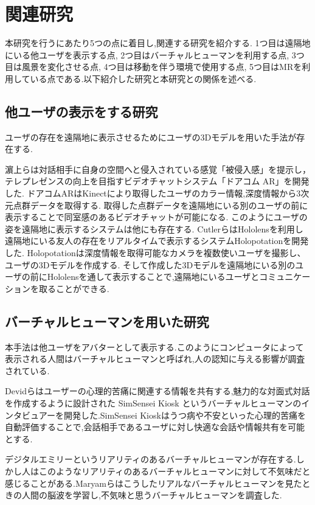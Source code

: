\section{関連研究}
本研究を行うにあたり5つの点に着目し,関連する研究を紹介する. 1つ目は遠隔地にいる他ユーザを表示する点, 2つ目はバーチャルヒューマンを利用する点, 3つ目は風景を変化させる点, 4つ目は移動を伴う環境で使用する点, 5つ目はMRを利用している点である.以下紹介した研究と本研究との関係を述べる.


\subsection{他ユーザの表示をする研究}
ユーザの存在を遠隔地に表示させるためにユーザの3Dモデルを用いた手法が存在する.

濵上らは対話相手に自身の空間へと侵入されている感覚「被侵入感」を提示し，テレプレゼンスの向上を目指すビデオチャットシステム「ドアコム AR」を開発した\cite{doorcom}.
ドアコムARはKinectにより取得したユーザのカラー情報,深度情報から3次元点群データを取得する.
取得した点群データを遠隔地にいる別のユーザの前に表示することで同室感のあるビデオチャットが可能になる.
このようにユーザの姿を遠隔地に表示するシステムは他にも存在する.
CutlerらはHololens\cite{Hololens}を利用し遠隔地にいる友人の存在をリアルタイムで表示するシステムHolopotationを開発した\cite{holopotation}.
Holopotationは深度情報を取得可能なカメラを複数使いユーザを撮影し、ユーザの3Dモデルを作成する.
そして作成した3Dモデルを遠隔地にいる別のユーザの前にHololensを通して表示することで,遠隔地にいるユーザとコミュニケーションを取ることができる.

\clearpage

\subsection{バーチャルヒューマンを用いた研究}
本手法は他ユーザをアバターとして表示する.このようにコンピュータによって表示される人間はバーチャルヒューマンと呼ばれ,人の認知に与える影響が調査されている.

Devidらはユーザーの心理的苦痛に関連する情報を共有する,魅力的な対面式対話を作成するように設計された SimSensei Kiosk というバーチャルヒューマンのインタビュアーを開発した\cite{kiosk}.SimSensei Kioskはうつ病や不安といった心理的苦痛を自動評価することで,会話相手であるユーザに対し快適な会話や情報共有を可能とする.

デジタルエミリーというリアリティのあるバーチャルヒューマンが存在する\cite{digitalemily}.しかし人はこのようなリアリティのあるバーチャルヒューマンに対して不気味だと感じることがある.Maryamらはこうしたリアルなバーチャルヒューマンを見たときの人間の脳波を学習し,不気味と思うバーチャルヒューマンを調査した\cite{maryam}.


